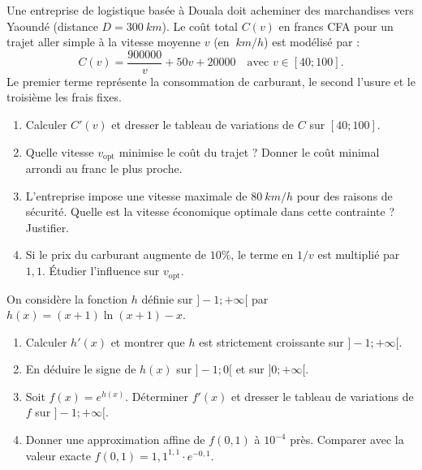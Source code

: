 \documentclass[11pt]{article}
\begin{document}
\begin{exercice}
Une entreprise de logistique basée à Douala doit acheminer des marchandises vers Yaoundé (distance $D = \SI{300}{km}$). Le coût total $C(v)$ en francs CFA pour un trajet aller simple à la vitesse moyenne $v$ (en $\SI{}{km/h}$) est modélisé par :
\[
C(v) = \frac{900000}{v} + 50v + 20000 \quad \text{avec } v \in [40; 100].
\]
Le premier terme représente la consommation de carburant, le second l'usure et le troisième les frais fixes.
\begin{enumerate}
    \item Calculer $C'(v)$ et dresser le tableau de variations de $C$ sur $[40; 100]$.
    \item Quelle vitesse $v_{\text{opt}}$ minimise le coût du trajet ? Donner le coût minimal arrondi au franc le plus proche.
    \item L'entreprise impose une vitesse maximale de $\SI{80}{km/h}$ pour des raisons de sécurité. Quelle est la vitesse économique optimale dans cette contrainte ? Justifier.
    \item Si le prix du carburant augmente de $10\%$, le terme en $1/v$ est multiplié par $1,1$. Étudier l'influence sur $v_{\text{opt}}$.
\end{enumerate}
\end{exercice}

\begin{exercice}
On considère la fonction $h$ définie sur $]-1; +\infty[$ par $h(x) = (x+1)\ln(x+1) - x$.
\begin{enumerate}
    \item Calculer $h'(x)$ et montrer que $h$ est strictement croissante sur $]-1; +\infty[$.
    \item En déduire le signe de $h(x)$ sur $]-1; 0[$ et sur $]0; +\infty[$.
    \item Soit $f(x) = e^{h(x)}$. Déterminer $f'(x)$ et dresser le tableau de variations de $f$ sur $]-1; +\infty[$.
    \item Donner une approximation affine de $f(0,1)$ à $10^{-4}$ près. Comparer avec la valeur exacte $f(0,1) = 1,1^{1,1} \cdot e^{-0,1}$.
\end{enumerate}
\end{exercice}
\end{document}
